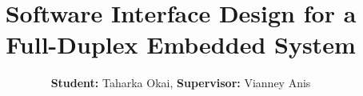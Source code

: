 

\usepackage[T1]{fontenc}
\usepackage{lmodern}
\usepackage[size=custom,width=100,height=70.71,scale=1.0]{beamerposter}

\usepackage{graphicx}
\usepackage{booktabs}
\usepackage{tikz}
\usepackage{pgfplots}
\pgfplotsset{compat=1.17}
\usepackage{multicol}
\usepackage{caption}
\captionsetup{font=normalsize}

\newcommand{\ncols}{3}
\newlength{\sepwidth}
\newlength{\colwidth}
\newlength{\midspace}
\setlength{\sepwidth}{0.020\paperwidth}
\setlength{\colwidth}{
{\dimexpr \paperwidth / \ncols \relax} -
{\dimexpr \sepwidth + \sepwidth / \ncols \relax}
}
\setlength{\midspace}{20ex}

\newcommand{\separatorcolumn}{\begin{column}{\sepwidth}\end{column}}


\title{Software Interface Design for a Full-Duplex Embedded System}

\author{\textbf{Student:} Taharka Okai, \textbf{Supervisor:} Vianney Anis}


\newcommand{\beamerblocknoheader}{
  \setbeamertemplate{block begin}{
    {\parskip0pt\par}
    \usebeamerfont{block body}
    \vskip-0.5ex
    \begin{beamercolorbox}[colsep*=0ex]{block body}
    \justifying
    \setlength{\parskip}{1ex}
    \vskip-2ex
  }

  \setbeamertemplate{block alerted begin}{
    {\parskip0pt\par}
    \usebeamerfont{block body}
    \vskip-0.5ex
    \begin{beamercolorbox}[colsep*=0ex]{block alerted body}
    \justifying
    \begin{adjustwidth}{1ex}{1ex}
    \setlength{\parskip}{1ex}
    \vskip-2ex
  }
}

